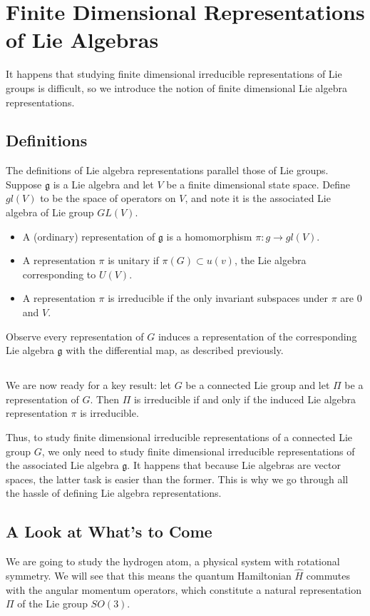 \section{Finite Dimensional Representations of Lie Algebras}
It happens that studying finite dimensional irreducible representations of Lie groups is difficult, so we introduce the notion of finite dimensional Lie algebra representations.

\subsection{Definitions}
The definitions of Lie algebra representations parallel those of Lie groups. Suppose $\mathfrak g$ is a Lie algebra and let $V$ be a finite dimensional state space. Define $gl(V)$ to be the space of operators on $V$, and note it is the associated Lie algebra of Lie group $GL(V)$.
\begin{itemize}
    \item A (ordinary) representation of $\mathfrak g$ is a homomorphism $\mathfrak \pi: g \rightarrow gl(V)$.
    \item A representation $\pi$ is unitary if $\pi(G) \subset u(v)$, the Lie algebra corresponding to $U(V)$.
    \item A representation $\pi$ is irreducible if the only invariant subspaces under $\pi$ are $0$ and $V$.
\end{itemize}
Observe every representation of $G$ induces a representation of the corresponding Lie algebra $\mathfrak g$ with the differential map, as described previously.

\subsection{}
We are now ready for a key result: let $G$ be a connected Lie group and let $\Pi$ be a representation of $G$. Then $\Pi$ is irreducible if and only if the induced Lie algebra representation $\pi$ is irreducible.

Thus, to study finite dimensional irreducible representations of a connected Lie group $G$, we only need to study finite dimensional irreducible representations of the associated Lie algebra $\mathfrak g$. It happens that because Lie algebras are vector spaces, the latter task is easier than the former. This is why we go through all the hassle of defining Lie algebra representations.

\subsection{A Look at What's to Come}
We are going to study the hydrogen atom, a physical system with rotational symmetry. We will see that this means the quantum Hamiltonian $\hat{H}$ commutes with the angular momentum operators, which constitute a natural representation $\Pi$ of the Lie group $SO(3)$.

